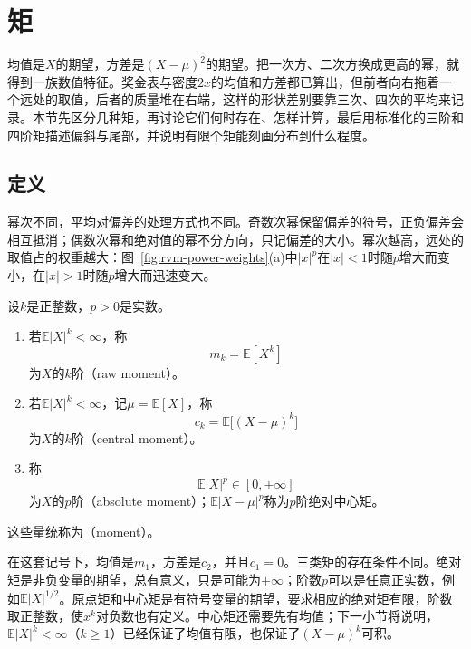 \section{矩}
\label{sec:rvm-moments}

均值是$X$的期望，方差是$(X-\mu)^{2}$的期望。把一次方、二次方换成更高的幂，就得到一族数值特征。奖金表与密度$2x$的均值和方差都已算出，但前者向右拖着一个远处的取值，后者的质量堆在右端，这样的形状差别要靠三次、四次的平均来记录。本节先区分几种矩，再讨论它们何时存在、怎样计算，最后用标准化的三阶和四阶矩描述偏斜与尾部，并说明有限个矩能刻画分布到什么程度。

\subsection{定义}
\label{sec:rvm-moment-definition}

幂次不同，平均对偏差的处理方式也不同。奇数次幂保留偏差的符号，正负偏差会相互抵消；偶数次幂和绝对值的幂不分方向，只记偏差的大小。幂次越高，远处的取值占的权重越大：图~\ref{fig:rvm-power-weights}(a)中$\lvert x\rvert^{p}$在$\lvert x\rvert<1$时随$p$增大而变小，在$\lvert x\rvert>1$时随$p$增大而迅速变大。

\begin{definition}[矩]
\label{def:rvm-moments}
设$k$是正整数，$p>0$是实数。
\begin{enumerate}
 \item 若$\mathbb{E}\lvert X\rvert^{k}<\infty$，称
 \begin{equation}
  m_k=\mathbb{E}[X^{k}]
  \label{eq:rvm-raw-moment}
 \end{equation}
 为$X$的$k$阶（raw moment）。
 \item 若$\mathbb{E}\lvert X\rvert^{k}<\infty$，记$\mu=\mathbb{E}[X]$，称
 \begin{equation}
  c_k=\mathbb{E}\bigl[(X-\mu)^{k}\bigr]
  \label{eq:rvm-central-moment}
 \end{equation}
 为$X$的$k$阶（central moment）。
 \item 称
 \begin{equation}
  \mathbb{E}\lvert X\rvert^{p}\in[0,+\infty]
  \label{eq:rvm-absolute-moment}
 \end{equation}
 为$X$的$p$阶（absolute moment）；$\mathbb{E}\lvert X-\mu\rvert^{p}$称为$p$阶绝对中心矩。
\end{enumerate}
这些量统称为（moment）。
\end{definition}

在这套记号下，均值是$m_1$，方差是$c_2$，并且$c_1=0$。三类矩的存在条件不同。绝对矩是非负变量的期望，总有意义，只是可能为$+\infty$；阶数$p$可以是任意正实数，例如$\mathbb{E}\lvert X\rvert^{1/2}$。原点矩和中心矩是有符号变量的期望，要求相应的绝对矩有限，阶数取正整数，使$x^{k}$对负数也有定义。中心矩还需要先有均值；下一小节将说明，$\mathbb{E}\lvert X\rvert^{k}<\infty$（$k\geq1$）已经保证了均值有限，也保证了$(X-\mu)^{k}$可积。

